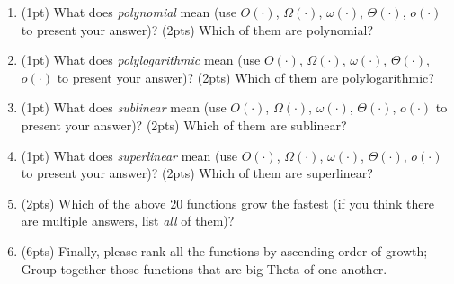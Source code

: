 \documentclass{article}[12pt]
\begin{document}
\begin{enumerate}[label=(\arabic*)]
  \item (1pt) What does \emph{polynomial} mean (use $O(\cdot)$, $\Omega(\cdot)$, $\omega(\cdot)$, $\Theta(\cdot)$, $o(\cdot)$ to present your answer)? (2pts) Which of them are polynomial?
  
  \item (1pt) What does \emph{polylogarithmic} mean (use $O(\cdot)$, $\Omega(\cdot)$, $\omega(\cdot)$, $\Theta(\cdot)$, $o(\cdot)$ to present your answer)? (2pts) Which of them are polylogarithmic?
  
  \item (1pt) What does \emph{sublinear} mean (use $O(\cdot)$, $\Omega(\cdot)$, $\omega(\cdot)$, $\Theta(\cdot)$, $o(\cdot)$ to present your answer)? (2pts) Which of them are sublinear?
 
  \item (1pt) What does \emph{superlinear} mean (use $O(\cdot)$, $\Omega(\cdot)$, $\omega(\cdot)$, $\Theta(\cdot)$, $o(\cdot)$ to present your answer)? (2pts) Which of them are superlinear?

  \item (2pts) Which of the above 20 functions grow the fastest (if you think there are multiple answers, list \emph{all} of them)?

  \item (6pts) Finally, please rank all the functions by ascending order of growth; Group together those functions that are big-Theta of one another.
  
\end{enumerate}
\end{document}
